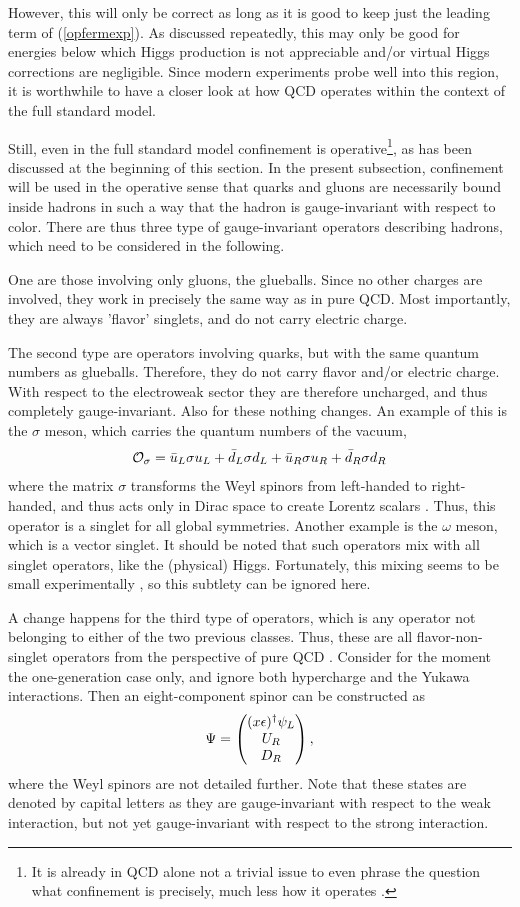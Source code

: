 \documentclass[final,twoside,12pt]{article}
\newcommand*{\no}{\noindent}
\newcommand*{\be}{\begin{equation}}
\newcommand*{\ee}{\end{equation}}
\newcommand*{\pref}[1]{(\ref{#1})}
\newcommand*{\1}{1\!\!\!\bot}
\newcommand*{\bma}{\begin{matrix}}
\newcommand*{\ema}{\end{matrix}}
\newcommand*{\bpm}{\left(\bma}
\newcommand*{\epm}{\ema\right)}
\newcommand*{\op}{{\cal O}}
\begin{document}
However, this will only be correct as long as it is good to keep just the leading term of \pref{opfermexp}. As discussed repeatedly, this may only be good for energies below which Higgs production is not appreciable and/or virtual Higgs corrections are negligible. Since modern experiments probe well into this region, it is worthwhile to have a closer look at how QCD operates within the context of the full standard model.

Still, even in the full standard model confinement is operative\footnote{It is already in QCD alone not a trivial issue to even phrase the question what confinement is precisely, much less how it operates \cite{Greensite:2011zz,Greensite:2017ajx,Greensite:2018mhh}.}, as has been discussed at the beginning of this section. In the present subsection, confinement will be used in the operative sense that quarks and gluons are necessarily bound inside hadrons in such a way that the hadron is gauge-invariant with respect to color. There are thus three type of gauge-invariant operators describing hadrons, which need to be considered in the following.

One are those involving only gluons, the glueballs. Since no other charges are involved, they work in precisely the same way as in pure QCD. Most importantly, they are always 'flavor' singlets, and do not carry electric charge.

The second type are operators involving quarks, but with the same quantum numbers as glueballs. Therefore, they do not carry flavor and/or electric charge. With respect to the electroweak sector they are therefore uncharged, and thus completely gauge-invariant. Also for these nothing changes. An example of this is the $\sigma$ meson, which carries the quantum numbers of the vacuum,
\be
\op_\sigma=\bar{u}_L\sigma u_L+\bar{d}_L\sigma d_L+\bar{u}_R\sigma u_R+\bar{d}_R\sigma d_R\label{sigma}
\ee
\no where the matrix $\sigma$ transforms the Weyl spinors from left-handed to right-handed, and thus acts only in Dirac space to create Lorentz scalars \cite{Aitchison:2007fn}. Thus, this operator is a singlet for all global symmetries. Another example is the $\omega$ meson, which is a vector singlet. It should be noted that such operators mix with all singlet operators, like the (physical) Higgs. Fortunately, this mixing seems to be small experimentally \cite{pdg}, so this subtlety can be ignored here.

A change happens for the third type of operators, which is any operator not belonging to either of the two previous classes. Thus, these are all flavor-non-singlet operators from the perspective of pure QCD \cite{Egger:2017tkd}. Consider for the moment the one-generation case only, and ignore both hypercharge and the Yukawa interactions. Then an eight-component spinor can be constructed as
\be
\Psi=\bpm (x\epsilon)^\dagger\psi_L\cr U_R \cr D_R\epm\label{qcdquark},
\ee
\no where the Weyl spinors are not detailed further. Note that these states are denoted by capital letters as they are gauge-invariant with respect to the weak interaction, but not yet gauge-invariant with respect to the strong interaction.
\end{document}
